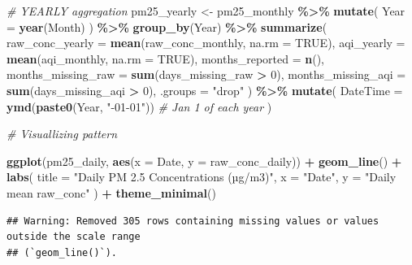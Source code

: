 \documentclass[
]{article}
\newenvironment{Shaded}{\begin{snugshade}}{\end{snugshade}}
\newcommand{\AttributeTok}[1]{\textcolor[rgb]{0.13,0.29,0.53}{#1}}
\newcommand{\CommentTok}[1]{\textcolor[rgb]{0.56,0.35,0.01}{\textit{#1}}}
\newcommand{\ConstantTok}[1]{\textcolor[rgb]{0.56,0.35,0.01}{#1}}
\newcommand{\DecValTok}[1]{\textcolor[rgb]{0.00,0.00,0.81}{#1}}
\newcommand{\FunctionTok}[1]{\textcolor[rgb]{0.13,0.29,0.53}{\textbf{#1}}}
\newcommand{\NormalTok}[1]{#1}
\newcommand{\OtherTok}[1]{\textcolor[rgb]{0.56,0.35,0.01}{#1}}
\newcommand{\SpecialCharTok}[1]{\textcolor[rgb]{0.81,0.36,0.00}{\textbf{#1}}}
\newcommand{\StringTok}[1]{\textcolor[rgb]{0.31,0.60,0.02}{#1}}
\begin{document}
\begin{Shaded}
\begin{Highlighting}[]
\CommentTok{\# YEARLY aggregation}
\NormalTok{pm25\_yearly }\OtherTok{\textless{}{-}}\NormalTok{ pm25\_monthly }\SpecialCharTok{\%\textgreater{}\%}
  \FunctionTok{mutate}\NormalTok{(}
    \AttributeTok{Year =} \FunctionTok{year}\NormalTok{(Month)}
\NormalTok{  ) }\SpecialCharTok{\%\textgreater{}\%}
  \FunctionTok{group\_by}\NormalTok{(Year) }\SpecialCharTok{\%\textgreater{}\%}
  \FunctionTok{summarize}\NormalTok{(}
    \AttributeTok{raw\_conc\_yearly    =} \FunctionTok{mean}\NormalTok{(raw\_conc\_monthly, }\AttributeTok{na.rm =} \ConstantTok{TRUE}\NormalTok{),}
    \AttributeTok{aqi\_yearly         =} \FunctionTok{mean}\NormalTok{(aqi\_monthly,      }\AttributeTok{na.rm =} \ConstantTok{TRUE}\NormalTok{),}
    \AttributeTok{months\_reported    =} \FunctionTok{n}\NormalTok{(),}
    \AttributeTok{months\_missing\_raw =} \FunctionTok{sum}\NormalTok{(days\_missing\_raw }\SpecialCharTok{\textgreater{}} \DecValTok{0}\NormalTok{),}
    \AttributeTok{months\_missing\_aqi =} \FunctionTok{sum}\NormalTok{(days\_missing\_aqi }\SpecialCharTok{\textgreater{}} \DecValTok{0}\NormalTok{),}
    \AttributeTok{.groups =} \StringTok{"drop"}
\NormalTok{  ) }\SpecialCharTok{\%\textgreater{}\%}
  \FunctionTok{mutate}\NormalTok{(}
    \AttributeTok{DateTime =} \FunctionTok{ymd}\NormalTok{(}\FunctionTok{paste0}\NormalTok{(Year, }\StringTok{"{-}01{-}01"}\NormalTok{))    }\CommentTok{\# Jan 1 of each year}
\NormalTok{  )}


\CommentTok{\# Visuallizing pattern}

\FunctionTok{ggplot}\NormalTok{(pm25\_daily, }\FunctionTok{aes}\NormalTok{(}\AttributeTok{x =}\NormalTok{ Date, }\AttributeTok{y =}\NormalTok{ raw\_conc\_daily)) }\SpecialCharTok{+}
  \FunctionTok{geom\_line}\NormalTok{() }\SpecialCharTok{+}
  \FunctionTok{labs}\NormalTok{(}
    \AttributeTok{title =} \StringTok{"Daily PM 2.5 Concentrations (µg/m3)"}\NormalTok{,}
    \AttributeTok{x     =} \StringTok{"Date"}\NormalTok{,}
    \AttributeTok{y     =} \StringTok{"Daily mean raw\_conc"}
\NormalTok{  ) }\SpecialCharTok{+}
  \FunctionTok{theme\_minimal}\NormalTok{()}
\end{Highlighting}
\end{Shaded}

\begin{verbatim}
## Warning: Removed 305 rows containing missing values or values outside the scale range
## (`geom_line()`).
\end{verbatim}
\end{document}
